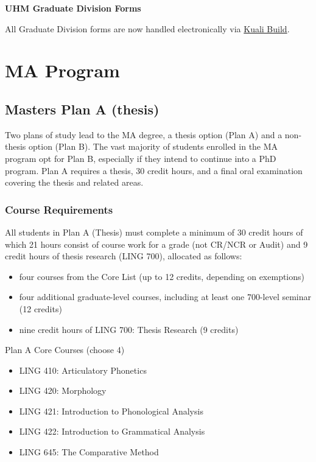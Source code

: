 \documentclass[
]{book}
\providecommand{\tightlist}{%
  \setlength{\itemsep}{0pt}\setlength{\parskip}{0pt}}
\begin{document}
\textbf{UHM Graduate Division Forms}

All Graduate Division forms are now handled electronically via \href{https://manoa.hawaii.edu/graduate/kuali-build-forms/}{Kuali Build}.

\part*{MA Program}\label{part-ma-program}

\chapter{Masters Plan A (thesis)}\label{maprogram}

Two plans of study lead to the MA degree, a thesis option (Plan A) and a non-thesis option (Plan B). The vast majority of students enrolled in the MA program opt for Plan B, especially if they intend to continue into a PhD program. Plan A requires a thesis, 30 credit hours, and a final oral examination covering the thesis and related areas.

\section{Course Requirements}\label{course-requirements}

All students in Plan A (Thesis) must complete a minimum of 30 credit hours of which 21 hours consist of course work for a grade (not CR/NCR or Audit) and 9 credit hours of thesis research (LING 700), allocated as follows:

\begin{itemize}
\tightlist
\item
  four courses from the Core List (up to 12 credits, depending on exemptions)
\item
  four additional graduate-level courses, including at least one 700-level seminar (12 credits)
\item
  nine credit hours of LING 700: Thesis Research (9 credits)
\end{itemize}

Plan A Core Courses (choose 4)

\begin{itemize}
\tightlist
\item
  LING 410: Articulatory Phonetics
\item
  LING 420: Morphology
\item
  LING 421: Introduction to Phonological Analysis
\item
  LING 422: Introduction to Grammatical Analysis
\item
  LING 645: The Comparative Method
\end{itemize}
\end{document}
